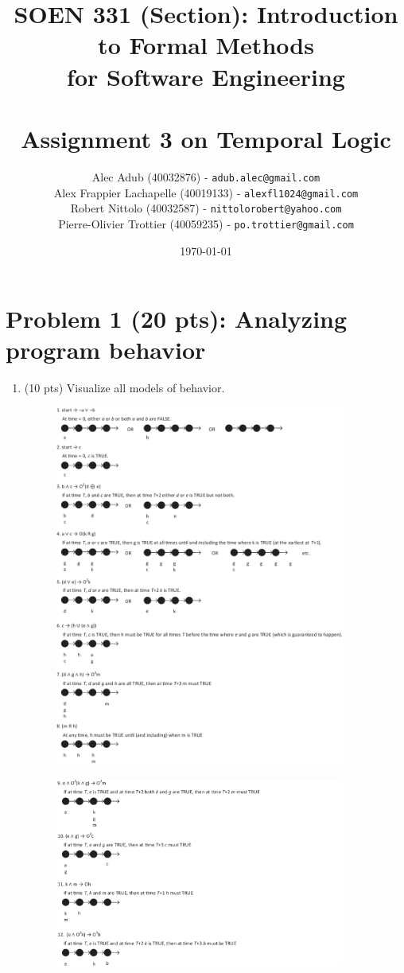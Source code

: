 \documentclass[12pt]{article}
\title{SOEN 331 (Section): Introduction to Formal Methods\\for Software Engineering\\
\ \\
Assignment 3 on Temporal Logic}
\author{\begin{tabular}{c}
Alec Adub (40032876) - \texttt{adub.alec@gmail.com} \tabularnewline
Alex Frappier Lachapelle (40019133) - \texttt{alexfl1024@gmail.com} \tabularnewline
Robert Nittolo (40032587) - \texttt{nittolorobert@yahoo.com} \tabularnewline
Pierre-Olivier Trottier (40059235) - \texttt{po.trottier@gmail.com} \tabularnewline\\
\end{tabular}
}
\date{\today}
\begin{document}
\maketitle

\newpage

\section*{Problem 1 (20 pts):  Analyzing program behavior}

\begin{enumerate}

\item (10 pts) Visualize all models of behavior.

\begin{figure}[h!]
  \centering
  \includegraphics[width=0.9\textwidth]{q1-part1.pdf}
\end{figure}

\newpage

\begin{figure}[h!]
  \centering
  \includegraphics[width=0.9\textwidth]{q1-part2.pdf}
\end{figure}


\end{enumerate}
\end{document}
